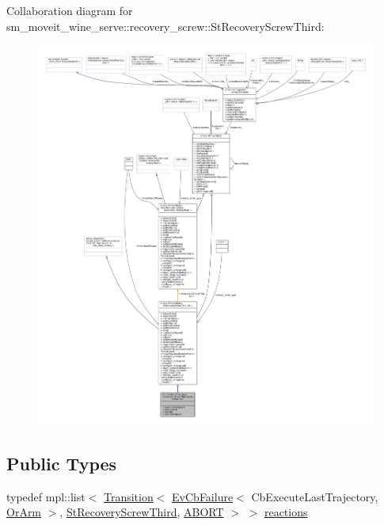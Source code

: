 Collaboration diagram for sm\+\_\+moveit\+\_\+wine\+\_\+serve\+:\+:recovery\+\_\+screw\+:\+:St\+Recovery\+Screw\+Third\+:
\nopagebreak
\begin{figure}[H]
\begin{center}
\leavevmode
\includegraphics[width=350pt]{structsm__moveit__wine__serve_1_1recovery__screw_1_1StRecoveryScrewThird__coll__graph}
\end{center}
\end{figure}
\subsection*{Public Types}
\begin{DoxyCompactItemize}
\item 
typedef mpl\+::list$<$ \hyperlink{classsmacc_1_1Transition}{Transition}$<$ \hyperlink{structsmacc_1_1EvCbFailure}{Ev\+Cb\+Failure}$<$ Cb\+Execute\+Last\+Trajectory, \hyperlink{classsm__moveit__wine__serve_1_1OrArm}{Or\+Arm} $>$, \hyperlink{structsm__moveit__wine__serve_1_1recovery__screw_1_1StRecoveryScrewThird}{St\+Recovery\+Screw\+Third}, \hyperlink{structsmacc_1_1default__transition__tags_1_1ABORT}{A\+B\+O\+RT} $>$ $>$ \hyperlink{structsm__moveit__wine__serve_1_1recovery__screw_1_1StRecoveryScrewThird_a6d140f74b679e517cdf435af5593e065}{reactions}
\end{DoxyCompactItemize}

